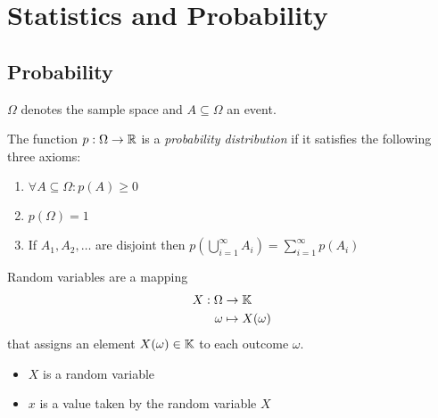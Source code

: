 \chapter{Statistics and Probability}



\section{Probability}
\begin{notation}
\(\Omega\) denotes the sample space and \(A \subseteq \Omega\) an event.
\end{notation}

\begin{definition}[Probability]
The function \(p: \Omega \to \mathbb{R}\) is a \textit{probability distribution} if it satisfies the following three axioms:
\begin{enumerate}
\item \(\forall A \subseteq \Omega: p(A) \geq 0\)
\item \(p(\Omega) = 1\)
\item If \(A_1, A_2, \ldots\) are disjoint then \(p(\bigcup_{i=1}^\infty A_i) = \sum_{i=1}^\infty p(A_i)\)
\end{enumerate}
\end{definition}

\begin{definition}
Random variables are a mapping \begin{align*}
X: \Omega &\to \mathbb{K}\\
\omega &\mapsto X(\omega)
\end{align*}
that assigns an element \(X(\omega) \in \mathbb{K}\) to each outcome \(\omega\).
\end{definition}

\begin{notation}\hfill
\begin{itemize}
\item \(X\) is a random variable
\item \(x\) is a value taken by the random variable \(X\)
\end{itemize}
\end{notation}

